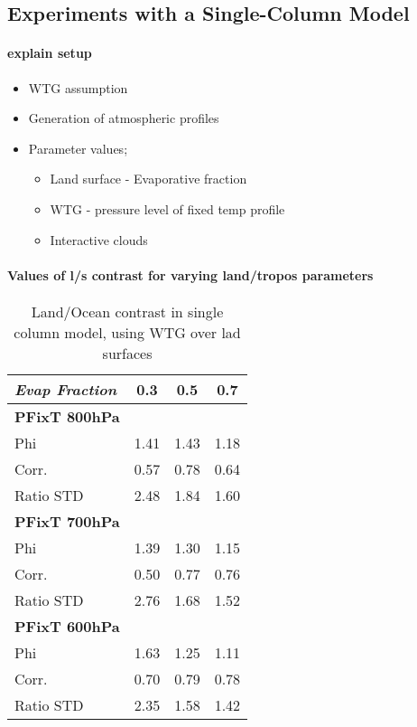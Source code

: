 \subsection{Experiments with a Single-Column Model}
\label{sec:mech_scm}
\paragraph{explain setup}
\begin{itemize}
	\item WTG assumption
	\item Generation of atmospheric profiles
	\item Parameter values;
		\begin{itemize}
			\item Land surface - Evaporative fraction
			\item WTG - pressure level of fixed temp profile
			\item Interactive clouds
		\end{itemize}
\end{itemize}
\paragraph{Values of l/s contrast for varying land/tropos parameters}
\begin{center}
	\begin{table}[ht]
		\caption{Land/Ocean contrast in single column model, using WTG over lad 
		surfaces}
		\label{tab:scmphi}
		\scriptsize
	\begin{tabular}{ l  c  c  c }
		\textit{Evap Fraction}		& 0.3   & 0.5  & 0.7 \\ \hline
		\textbf{PFixT 800hPa}\\%
	Phi  							& 1.41  & 1.43 & 1.18\\ %
	Corr.							& 0.57  & 0.78 & 0.64\\ %
	Ratio STD           			& 2.48  & 1.84 & 1.60\\ \hline
		\textbf{PFixT 700hPa}\\%
	Phi  							& 1.39  & 1.30 & 1.15\\ %
	Corr.							& 0.50  & 0.77 & 0.76\\ %
	Ratio STD           			& 2.76  & 1.68 & 1.52\\ \hline
		\textbf{PFixT 600hPa}\\%
	Phi  							& 1.63  & 1.25 & 1.11\\ %
	Corr.							& 0.70  & 0.79 & 0.78\\ %
	Ratio STD           			& 2.35  & 1.58 & 1.42\\ \hline
	\end{tabular}
	\end{table}
\end{center}
